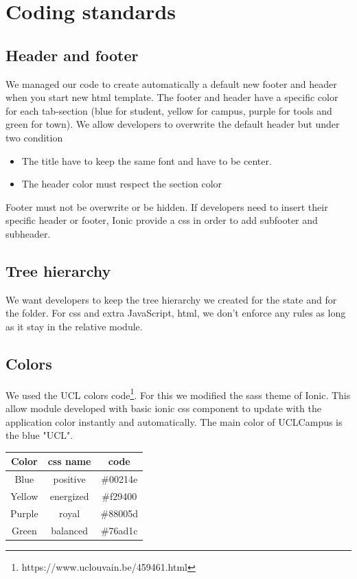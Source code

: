 \documentclass{eplmastersthesis}
\begin{document}
\section{Coding standards}
\subsection{Header and footer}
We managed our code to create automatically a default new footer and header when you start new html template. The footer and header have a specific color for each tab-section (blue for student, yellow for campus, purple for tools and green for town). We allow developers to overwrite the default header but under two condition
\begin{itemize}
\item The title have to keep the same font and have to be center.
\item The header color must respect the section color
\end{itemize}
Footer must not be overwrite or be hidden. If developers need to insert their specific header or footer, Ionic provide a css in order to add subfooter and subheader.
\subsection{Tree hierarchy}
We want developers to keep the tree hierarchy we created for the state and for the folder. For css and extra JavaScript, html, we don't enforce any rules as long as it stay in the relative module.
\subsection{Colors}
We used the UCL colors code\footnote{https://www.uclouvain.be/459461.html}. For this we modified the sass theme of Ionic. This allow module developed with basic ionic css component to update with the application color instantly and automatically. The main color of UCLCampus is the blue "UCL".

\begin{center}
    \begin{tabular}{ | c | c | c |}
    \hline
    Color & css name & code\\ \hline
    Blue & positive & \#00214e\\ \hline
    Yellow & energized & \#f29400\\ \hline
    Purple & royal & \#88005d\\ \hline
    Green & balanced & \#76ad1c\\ \hline
    \end{tabular}
\end{center}
\end{document}
